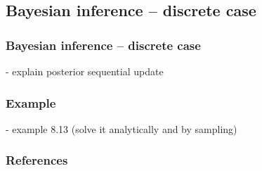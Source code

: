 \subsection{Bayesian inference -- discrete case}

\begin{frame}
    \frametitle{Bayesian inference -- discrete case}

- explain posterior sequential update

\end{frame}

\begin{frame}
    \frametitle{Example}

- example 8.13 (solve it analytically and by sampling)

\end{frame}

\begin{frame}
    \frametitle{References}

    \tiny{
        
        
    }
\end{frame}

\begin{comment}
\end{comment}



